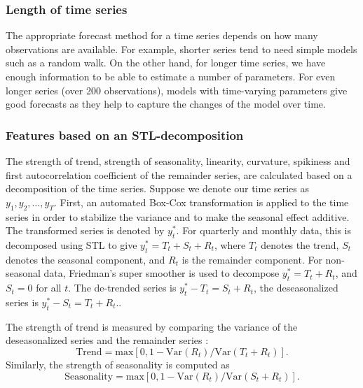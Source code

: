 \documentclass[11pt,a4paper,]{article}
\def\var{\text{Var}}
\begin{document}
\hypertarget{length-of-time-series}{%
\subsubsection*{Length of time series}\label{length-of-time-series}}

The appropriate forecast method for a time series depends on how many observations are available. For example, shorter series tend to need simple models such as a random walk. On the other hand, for longer time series, we have enough information to be able to estimate a number of parameters. For even longer series (over 200 observations), models with time-varying parameters give good forecasts as they help to capture the changes of the model over time.

\hypertarget{features-based-on-an-stl-decomposition}{%
\subsubsection*{Features based on an STL-decomposition}\label{features-based-on-an-stl-decomposition}}

The strength of trend, strength of seasonality, linearity, curvature, spikiness and first autocorrelation coefficient of the remainder series, are calculated based on a decomposition of the time series. Suppose we denote our time series as \(y_1, y_2, \dots,y_T\). First, an automated Box-Cox transformation \autocite{Guerrero1993} is applied to the time series in order to stabilize the variance and to make the seasonal effect additive. The transformed series is denoted by \(y_{t}^*\). For quarterly and monthly data, this is decomposed using STL \autocite{cleveland1990stl} to give \(y_t^*=T_t+S_t+R_t\), where \(T_t\) denotes the trend, \(S_t\) denotes the seasonal component, and \(R_t\) is the remainder component. For non-seasonal data, Friedman's super smoother \autocite{supsmu} is used to decompose \(y_t^*=T_t+R_t\), and \(S_t=0\) for all \(t\). The de-trended series is \(y_t^*-T_t=S_t+R_t\), the deseasonalized series is \(y_t^*-S_t = T_t+R_t\)..

The strength of trend is measured by comparing the variance of the deseasonalized series and the remainder series \autocite{wang2009rule}:
\[
    \text{Trend} = \text{max}\left[0, 1 - \var(R_{t})/\var(T_t+R_t)\right].
\]
Similarly, the strength of seasonality is computed as
\[
    \text{Seasonality} = \text{max}\left[0, 1- \var(R_{t})/ \var(S_t+R_t)\right].
\]
\end{document}
